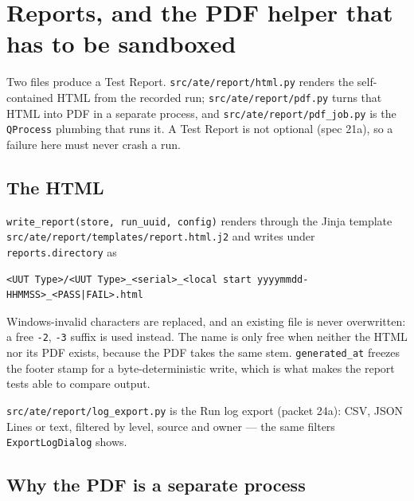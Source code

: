\chapter{Reports, and the PDF helper that has to be sandboxed}\label{ch:pdf}

Two files produce a Test Report. \texttt{src/\allowbreak{}ate/\allowbreak{}report/\allowbreak{}html.py} renders the self-contained HTML from
the recorded run; \texttt{src/\allowbreak{}ate/\allowbreak{}report/\allowbreak{}pdf.py} turns that HTML into PDF in a separate process, and
\texttt{src/\allowbreak{}ate/\allowbreak{}report/\allowbreak{}pdf\_\allowbreak{}job.py} is the \texttt{QProcess} plumbing that runs it. A Test Report is not
optional (spec 21a), so a failure here must never crash a run.

\section{The HTML}

\texttt{write\_\allowbreak{}report(store, run\_\allowbreak{}uuid, config)} renders through the Jinja template
\texttt{src/\allowbreak{}ate/\allowbreak{}report/\allowbreak{}templates/\allowbreak{}report.html.j2} and writes under \texttt{reports.directory} as

\begin{lstlisting}[language=ATEShell]
<UUT Type>/<UUT Type>_<serial>_<local start yyyymmdd-HHMMSS>_<PASS|FAIL>.html
\end{lstlisting}

Windows-invalid characters are replaced, and an existing file is never overwritten: a free
\texttt{-2}, \texttt{-3} suffix is used instead. The name is only free when neither the HTML nor its PDF
exists, because the PDF takes the same stem. \texttt{generated\_at} freezes the footer stamp for a
byte-deterministic write, which is what makes the report tests able to compare output.

\texttt{src/\allowbreak{}ate/\allowbreak{}report/\allowbreak{}log\_\allowbreak{}export.py} is the Run log export (packet 24a): CSV, JSON Lines or text,
filtered by level, source and owner --- the same filters \texttt{ExportLogDialog} shows.

\section{Why the PDF is a separate process}

